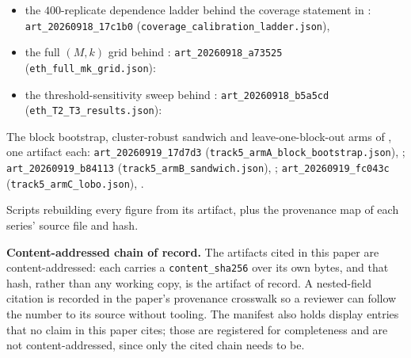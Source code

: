 \documentclass[sigconf,anonymous,review]{acmart}
\begin{document}
\begin{description}
\begin{itemize}
    \texttt{art\_20260920\_0e4cdb} (\texttt{track5\_skewness\_n5000.json}):
    \texttt{}
    \item the $400$-replicate dependence ladder behind the coverage statement in
    :
    \texttt{art\_20260918\_17c1b0} (\texttt{coverage\_calibration\_ladder.json}),
    \texttt{}
    \item the full $(M,k)$ grid behind :
    \texttt{art\_20260918\_a73525} (\texttt{eth\_full\_mk\_grid.json}):
    \texttt{}
    \item the threshold-sensitivity sweep behind :
    \texttt{art\_20260918\_b5a5cd} (\texttt{eth\_T2\_T3\_results.json}):
    \texttt{}
  \end{itemize}
  \item[Three dependence-aware radii.] The block bootstrap, cluster-robust
  sandwich and leave-one-block-out arms of , one
  artifact each:
  \texttt{art\_20260919\_17d7d3} (\texttt{track5\_armA\_block\_bootstrap.json}),
  \texttt{};
  \texttt{art\_20260919\_b84113} (\texttt{track5\_armB\_sandwich.json}),
  \texttt{};
  \texttt{art\_20260919\_fc043c} (\texttt{track5\_armC\_lobo.json}),
  \texttt{}.
  \item[Figure generators.] Scripts rebuilding every figure from its artifact,
  plus the provenance map of each series' source file and hash.
\end{description}

\textbf{Content-addressed chain of record.}
The artifacts cited in this paper are content-addressed: each carries a
\texttt{content\_sha256} over its own bytes, and that hash, rather than any
working copy, is the artifact of record. A nested-field citation is recorded in
the paper's provenance crosswalk so a reviewer can follow the number to its
source without tooling. The manifest also holds display entries that no claim in
this paper cites; those are registered for completeness and are not
content-addressed, since only the cited chain needs to be.
\end{document}

